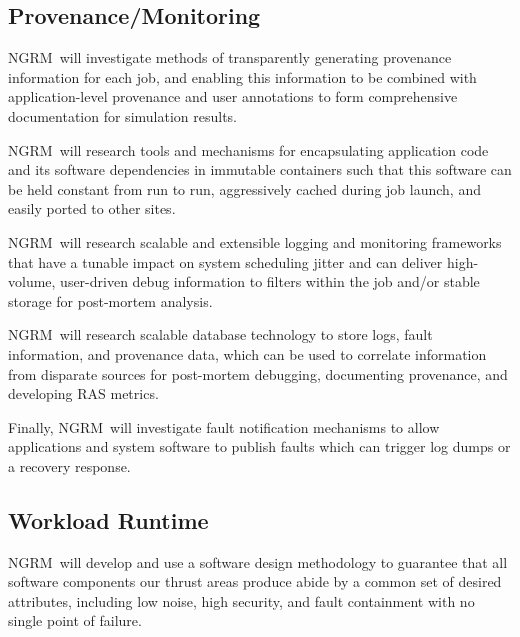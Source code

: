 \documentclass{article}
\newcommand{\ngrm}{NGRM}
\begin{document}
\subsection{Provenance/Monitoring}

\ngrm\ will investigate methods of transparently generating provenance
information for each job, and enabling this information to be combined
with application-level provenance and user annotations to form
comprehensive documentation for simulation results.

\ngrm\ will research tools and mechanisms for encapsulating application
code and its software dependencies in immutable containers such that
this software can be held constant from run to run, aggressively
cached during job launch, and easily ported to other sites.

\ngrm\ will research scalable and extensible logging and monitoring
frameworks that have a tunable impact on system scheduling jitter and
can deliver high-volume, user-driven debug information to filters within
the job and/or stable storage for post-mortem analysis.

\ngrm\ will research scalable database technology to store
logs, fault information, and provenance data, which can be used
to correlate information from disparate sources for post-mortem debugging,
documenting provenance, and developing RAS metrics.

Finally, \ngrm\ will investigate fault notification mechanisms
to allow applications and system software to publish
faults which can trigger log dumps or a recovery response.


\subsection{Workload Runtime}

\ngrm\ will develop and use a software design methodology to
guarantee that all software components our thrust areas produce
abide by a common set of desired attributes, including low noise,
high security, and fault containment with no single point of failure.











\appendix




\end{document}
